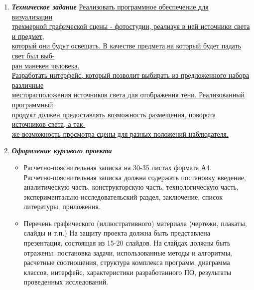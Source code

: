 \documentclass[12pt,a4paper,oneside]{report}
\begin{document}
	\begin{enumerate}
		\item \small {{ \textbf{\textit{Техническое задание}}} \underline{ 
				Реализовать программное обеспечение для визуализации  }
			\\ \underline{трехмерной графической сцены - фотостудии, реализуя в ней источники света и предмет, } 
			\\ \underline{который они будут освещать. В качестве предмета,на который будет падать свет был выб-}
			\\ \underline{ран манекен человека.} 
			\\ \underline{Разработать интерфейс, который позволит выбирать из предложенного набора различные } 
			\\ \underline{месторасположения источников света для отображения тени. Реализованный программный} 
			\\ \underline{ продукт должен предоставлять возможность размещения, поворота источников света, а так- }
			\\ \underline{ же возможность просмотра сцены для разных положений наблюдателя.}}
		\item \small {{\textbf{\textit{Оформление курсового проекта}}}
			\begin{itemize}
				\item \footnotesize Расчетно-пояснительная записка на 30-35 листах формата А4.\\
				Расчетно-пояснительная записка должна содержать постановку введение, аналитическую часть, конструкторскую часть, технологическую часть, экспериментально-исследовательский раздел, заключение, список литературы, приложения.
				\item \small Перечень графического (иллюстративного) материала (чертежи, плакаты, слайды и т.п.)   
				На защиту проекта должна быть представлена презентация, состоящая из 15-20 слайдов. На слайдах должны быть отражены: постановка задачи, использованные методы и алгоритмы, расчетные соотношения, структура комплекса программ, диаграмма классов, интерфейс, характеристики разработанного ПО, результаты проведенных исследований.
		\end{itemize}}
	\end{enumerate}
	
\end{document}
